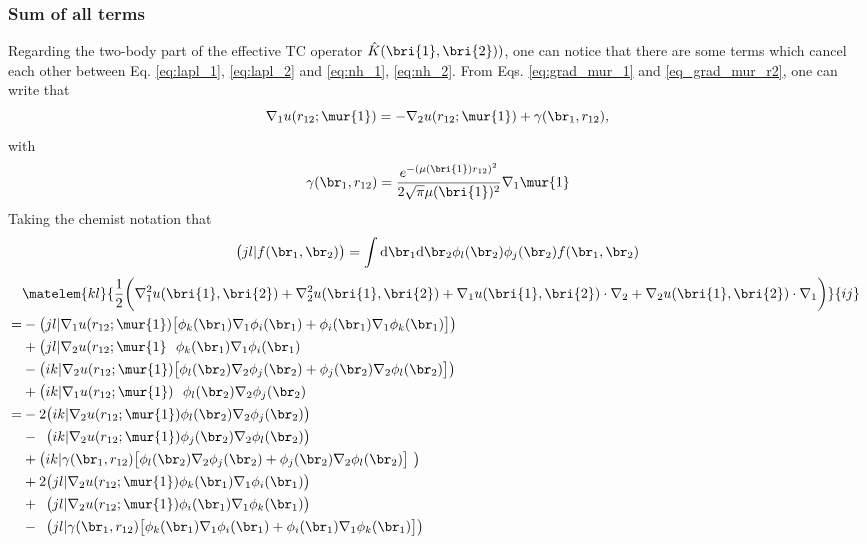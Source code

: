 \subsubsection{Sum of all terms}
Regarding the two-body part of the effective TC operator $\hat{K}(\bri{1},\bri{2}) ) $, one can notice that there are some terms which cancel each other between Eq. \eqref{eq:lapl_1}, \eqref{eq:lapl_2} and \eqref{eq:nh_1}, \eqref{eq:nh_2}. 
From Eqs. \eqref{eq:grad_mur_1} and \eqref{eq_grad_mur_r2}, one can write that
\begin{equation}
 \nabla_1 u(r_{12};\mur{1})  = - \nabla_2 u(r_{12};\mur{1}) + {\bf {\gamma}}(\br_1, r_{12}), 
\end{equation}
with 
\begin{equation}
 {\bf {\gamma}}(\br_1, r_{12}) = \frac{e^{-(\mu(\bri{1}) r_{12})^2}}{2 \sqrt{\pi} \mu(\bri{1})^2} \nabla_1{\mur{1}}
\end{equation}
Taking the chemist notation that
\begin{equation}
 \big(jl|f(\br_1,\br_2) \big) = \int \text{d}\br_{1} \text{d}\br_{2} \phi_l(\br_2) \phi_j(\br_2) f(\br_1,\br_2) 
\end{equation}
\begin{equation}
 \begin{aligned}
& \matelem{kl}{\frac{1}{2}\bigg( \nabla_1^2 u(\bri{1},\bri{2}) + \nabla_2^2u(\bri{1},\bri{2}) + \nabla_1 u(\bri{1},\bri{2}) \cdot \nabla_2 + \nabla_2 u(\bri{1},\bri{2}) \cdot \nabla_1 \bigg)}{ij} \\
 =& -\big(jl| \nabla_1 u(r_{12};\mur{1}) \big[ \phi_k(\br_1) \nabla_1 \phi_i(\br_1) + \phi_i(\br_1)\nabla_1 \phi_k(\br_1)\big] \big) \\
 &  +\big(jl| \nabla_2 u(r_{12};\mur{1}  \,\, \,\,      \phi_k(\br_1) \nabla_1 \phi_i(\br_1) \\
 &  -\big(ik| \nabla_2 u(r_{12};\mur{1}) \big[ \phi_l(\br_2) \nabla_2 \phi_j(\br_2) + \phi_j(\br_2)\nabla_2 \phi_l(\br_2)\big] \big) \\
 &  +\big(ik| \nabla_1 u(r_{12};\mur{1}) \,\, \,\,      \phi_l(\br_2) \nabla_2 \phi_j(\br_2) \\
 =& -2     \big(ik|\nabla_2u(r_{12};\mur{1}) \phi_l(\br_2) \nabla_2 \phi_j(\br_2)\big) \\
  & -\,\,\,\big(ik|\nabla_2u(r_{12};\mur{1}) \phi_j(\br_2)\nabla_2 \phi_l(\br_2) \big) \\
  & +       \big(ik|{\bf {\gamma}}(\br_1, r_{12}) \big[ \phi_l(\br_2)\nabla_2 \phi_j(\br_2) + \phi_j(\br_2)\nabla_2 \phi_l(\br_2) \big] \big) \\
  & +2      \big(jl|\nabla_2 u(r_{12};\mur{1}) \phi_k(\br_1) \nabla_1 \phi_i(\br_1) \big) \\
  & + \,\,\,\big(jl|\nabla_2 u(r_{12};\mur{1}) \phi_i(\br_1) \nabla_1 \phi_k(\br_1) \big) \\
  & - \,\,\,\big(jl|{\bf {\gamma}}(\br_1, r_{12}) \big[ \phi_k(\br_1) \nabla_1 \phi_i(\br_1) + \phi_i(\br_1) \nabla_1 \phi_k(\br_1) \big] \big)
 \end{aligned}
\end{equation}

